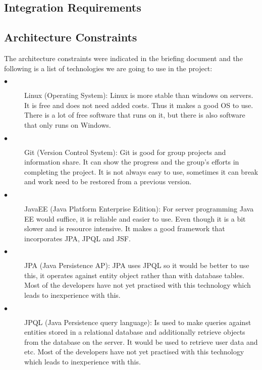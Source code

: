 \documentclass[12pt]{article}
\begin{document}
\subsection{Integration Requirements}
\subsection{Architecture Constraints}

The architecture constraints were indicated in the briefing document and the following is a list of technologies we are going to use in the project:

\begin{description}
  \item[$\bullet$] Linux (Operating System):
  Linux is more stable than windows on servers. It is free and does not need added costs. Thus it makes a good OS to use. There is a lot of free software that runs on it, but there is also software that only runs on Windows. 
  
  \item[$\bullet$] Git (Version Control System):
  Git is good for group projects and information share. It can show the progress and the group’s efforts in completing the project. It is not always easy to use, sometimes it can break and work need to be restored from a previous version.
  
  \item[$\bullet$] JavaEE (Java Platform Enterprise Edition):
  For server programming Java EE would suffice, it is reliable and easier to use. Even though it is a bit slower and is resource intensive. It makes a good framework that incorporates JPA,  JPQL and JSF.
  
  \item[$\bullet$]JPA (Java Persistence AP):
  JPA uses JPQL so it would be better to use this, it operates against entity object rather than with database tables. Most of the developers have not yet practised with this technology which leads to inexperience with this. 
  
  \item[$\bullet$] JPQL (Java Persistence query language):
  Is used to make queries against entities stored in a relational database and additionally retrieve objects from the database on the server. It would be used to retrieve user data and etc. Most of the developers have not yet practised with this technology which leads to inexperience with this. 
  

\end{description}
\end{document}
